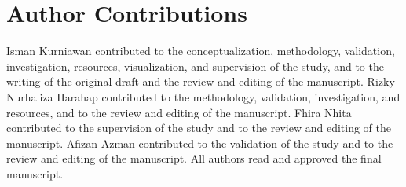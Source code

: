 \documentclass[10pt,a4paper]{article}
\begin{document}
\section*{Author Contributions}
Isman Kurniawan contributed to the conceptualization, methodology,
validation, investigation, resources, visualization, and supervision of
the study, and to the writing of the original draft and the review and
editing of the manuscript. Rizky Nurhaliza Harahap contributed to the
methodology, validation, investigation, and resources, and to the
review and editing of the manuscript. Fhira Nhita contributed to the supervision of the study and to the review
and editing of the manuscript. Afizan Azman contributed to the
validation of the study and to the review and editing of the
manuscript. All authors read and approved the final manuscript.



\end{document}

